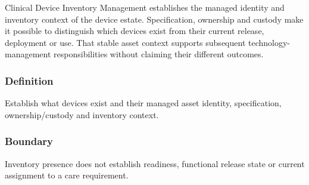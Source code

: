 Clinical Device Inventory Management establishes the managed identity and inventory context of the device estate. Specification, ownership and custody make it possible to distinguish which devices exist from their current release, deployment or use. That stable asset context supports subsequent technology-management responsibilities without claiming their different outcomes.

\subsubsection*{Definition}

Establish what devices exist and their managed asset identity, specification, ownership/\allowbreak{}custody and inventory context.

\subsubsection*{Boundary}

Inventory presence does not establish readiness, functional release state or current assignment to a care requirement.

